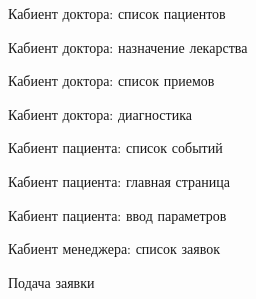 
\begin{figure}[h]
\caption{Кабиент доктора: список пациентов}
\label{app:doctor_cabinet_patients}
\end{figure}

\newpage \begin{figure}[h]
\caption{Кабиент доктора: назначение лекарства}
\label{app:doctor_cabinet_medicament}
\end{figure}

\newpage \begin{figure}[h]
\caption{Кабиент доктора: список приемов}
\label{app:doctor_cabinet_appointments}
\end{figure}

\newpage \begin{figure}[h]
\caption{Кабиент доктора: диагностика}
\label{app:doctor_cabinet_diagnostic}
\end{figure}

\newpage \begin{figure}[h]
\caption{Кабиент пациента: список событий}
\label{app:patient_cabinet_events}
\end{figure}

\newpage \begin{figure}[h]
\caption{Кабиент пациента: главная страница}
\label{app:patient_cabinet_main}
\end{figure}

\newpage \begin{figure}[h]
\caption{Кабиент пациента: ввод параметров}
\label{app:patient_cabinet_parameters}
\end{figure}

\newpage \begin{figure}[h]
\caption{Кабиент менеджера: список заявок}
\label{app:manager_cabinet_bid}
\end{figure}

\newpage \begin{figure}[h]
\caption{Подача заявки}
\label{app:bid_form}
\end{figure}

